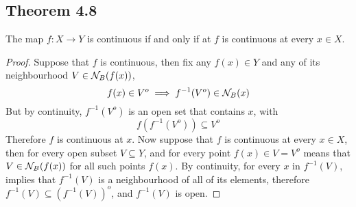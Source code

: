 \documentclass[../../main.tex]{subfiles}
\begin{document}
\subsection{Theorem 4.8}
\begin{wts}
The map $f:X\to Y$ is continuous if and only if at $f$ is continuous at every $x\in X$.
\end{wts}
\begin{proof}
    Suppose that $f$ is continuous, then fix any $f(x)\in Y$ and any of its neighbourhood $V\in\mathcal{N}_B({f(x)})$,
    \[
    f(x)\in V^o\implies f^{-1}(V^o)\in \mathcal{N}_B({x})
    \]
    But by continuity, $f^{-1}(V^o)$ is an open set that contains $x$, with
    \[
    f\left(f^{-1}(V^o)\right)\subseteq V^o
    \]
    Therefore $f$ is continuous at $x$. Now suppose that $f$ is continuous at every $x\in X$, then for every open subset $V\subseteq Y$, and for every point $f(x)\in V=V^o$ means that $V\in\mathcal{N}_B({f(x)})$ for all such points $f(x)$. By continuity, for every $x$ in $f^{-1}(V)$, implies that $f^{-1}(V)$ is a neighbourhood of all of its elements, therefore $f^{-1}(V)\subseteq\left(f^{-1}(V)\right)^o$, and $f^{-1}(V)$ is open.
\end{proof}
\end{document}
